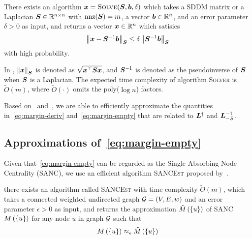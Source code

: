 \documentclass[sigconf]{acmart}
\begin{document}
\begin{lemma}\label{lem:solver}
    There exists an algorithm \(\boldsymbol{x}=\textsc{Solve}(\boldsymbol{S},\boldsymbol{b},\delta)\) which takes a SDDM matrix or a Laplacian \(\boldsymbol{S}\in\mathbb{R}^{n\times n}\) with \(\text{nnz}(\boldsymbol{S})=m\), a vector \(\boldsymbol{b}\in\mathbb{R}^n\), and an error parameter \(\delta>0\) as input, and returns a vector \(\boldsymbol{x}\in\mathbb{R}^n\) which satisies
    \[\left\Vert\boldsymbol{x}-\boldsymbol{S}^{-1}\boldsymbol{b}\right\Vert_{\boldsymbol{S}}\le\delta\left\Vert\boldsymbol{S}^{-1}\boldsymbol{b}\right\Vert_{\boldsymbol{S}}\]
    with high probability.
\end{lemma}

In , \(\left\Vert\boldsymbol{x}\right\Vert_{\boldsymbol{S}}\) is denoted as \(\sqrt{\boldsymbol{x}^\top\boldsymbol{S}\boldsymbol{x}}\), and \(\boldsymbol{S}^{-1}\) is denoted as the pseudoinverse of \(\boldsymbol{S}\) when \(\boldsymbol{S}\) is a Laplacian.
The expected time complexity of algorithm \textsc{Solver} is \(\tilde{O}(m)\), where \(\tilde{O}(\cdot)\) omits the poly(\(\log n\)) factors.

Based on~ and~, we are able to efficiently approximate the quantities in~\eqref{eq:margin-deriv} and~\eqref{eq:margin-empty} that are related to \(\boldsymbol{L}^\dagger\) and \(\boldsymbol{L}_{-S}^{-1}\).

\subsection{Approximations of~\eqref{eq:margin-empty}}\label{subsec:approx-margin-empty}

Given that~\eqref{eq:margin-empty} can be regarded as the Single Absorbing Node Centrality (SANC), we use an efficient algorithm \textsc{SANCEst} proposed by~\cite{ZhXuZh20}.
\begin{lemma}\label{lem:approxhk}
    there exists an algorithm called \textsc{SANCEst} with time complexity \(\tilde{O}(m)\), which takes a connected weighted undirected graph \(\mathcal{G}=(V,E,w)\) and an error parameter \(\epsilon>0\) as input, and returns the approximation \(\tilde{M}\left(\left\{u \right\}\right)\) of SANC \(M\left(\left\{u \right\}\right)\) for any node \(u\) in graph \(\mathcal{G}\) such that
    \[M\left(\left\{u \right\}\right)\approx_\epsilon\tilde{M}\left(\left\{u \right\}\right)\]
\end{lemma}
\end{document}
